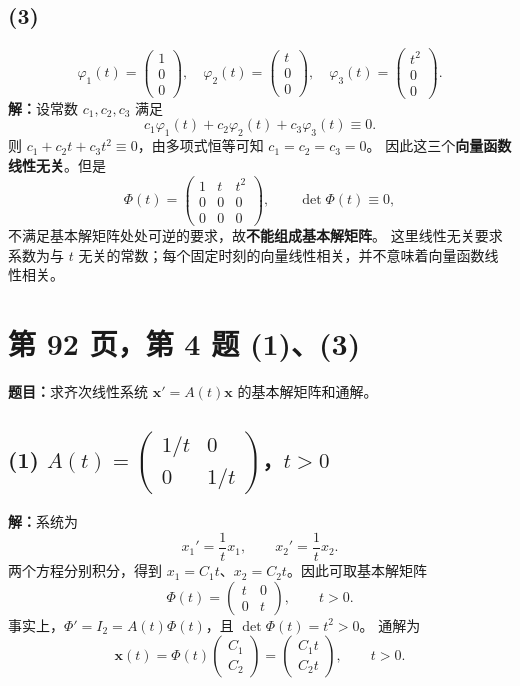 \documentclass[11pt,a4paper]{ctexart}
\newcommand{\xx}{\boldsymbol{x}}
\begin{document}
\subsection*{(3)}
\[
\varphi_1(t)=\begin{pmatrix}1\\0\\0\end{pmatrix},\quad
\varphi_2(t)=\begin{pmatrix}t\\0\\0\end{pmatrix},\quad
\varphi_3(t)=\begin{pmatrix}t^2\\0\\0\end{pmatrix}.
\]
\textbf{解：}设常数 $c_1,c_2,c_3$ 满足
\[
c_1\varphi_1(t)+c_2\varphi_2(t)+c_3\varphi_3(t)\equiv0.
\]
则 $c_1+c_2t+c_3t^2\equiv0$，由多项式恒等可知 $c_1=c_2=c_3=0$。
因此这三个\textbf{向量函数线性无关}。但是
\[
\Phi(t)=\begin{pmatrix}1&t&t^2\\0&0&0\\0&0&0\end{pmatrix},
\qquad \det\Phi(t)\equiv0,
\]
不满足基本解矩阵处处可逆的要求，故\textbf{不能组成基本解矩阵}。
这里线性无关要求系数为与 $t$ 无关的常数；每个固定时刻的向量线性相关，并不意味着向量函数线性相关。

\newpage
\section*{第 92 页，第 4 题 (1)、(3)}
\textbf{题目：}求齐次线性系统 $\xx'=A(t)\xx$ 的基本解矩阵和通解。

\subsection*{(1) $\displaystyle A(t)=\begin{pmatrix}1/t&0\\0&1/t\end{pmatrix}$，$t>0$}
\textbf{解：}系统为
\[
x_1'=\frac1t x_1,\qquad x_2'=\frac1t x_2.
\]
两个方程分别积分，得到 $x_1=C_1t$、$x_2=C_2t$。因此可取基本解矩阵
\[
\boxed{\Phi(t)=\begin{pmatrix}t&0\\0&t\end{pmatrix},\qquad t>0.}
\]
事实上，$\Phi'=I_2=A(t)\Phi(t)$，且 $\det\Phi(t)=t^2>0$。
通解为
\[
\boxed{\xx(t)=\Phi(t)\begin{pmatrix}C_1\\C_2\end{pmatrix}
=\begin{pmatrix}C_1t\\C_2t\end{pmatrix},\qquad t>0.}
\]
\end{document}
